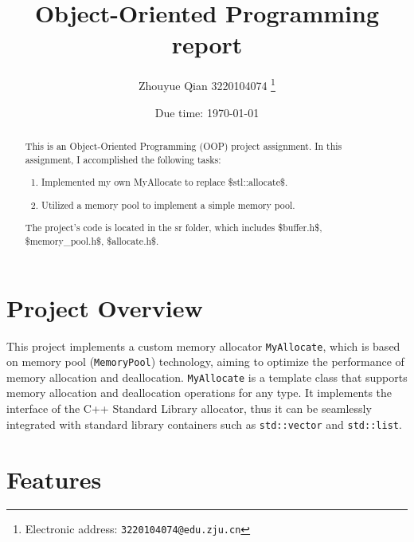 \documentclass[a4paper]{article}
\begin{document}
\title{Object-Oriented Programming report}

\author{Zhouyue Qian 3220104074
  \thanks{Electronic address: \texttt{3220104074@edu.zju.cn}}}
  


\date{Due time: \today}

\maketitle

\begin{abstract}
    This is an Object-Oriented Programming (OOP) project assignment. In this assignment, I accomplished the following tasks:
    \begin{enumerate}
      \item Implemented my own MyAllocate to replace \$stl::allocate\$.
      \item Utilized a memory pool to implement a simple memory pool.
    \end{enumerate}
    The project's code is located in the sr folder, which includes \$buffer.h\$, \$memory\_pool.h\$, \$allocate.h\$.
  \end{abstract}
  
  \section{Project Overview}

  This project implements a custom memory allocator \texttt{MyAllocate}, which is based on memory pool (\texttt{MemoryPool}) technology, aiming to optimize the performance of memory allocation and deallocation. \texttt{MyAllocate} is a template class that supports memory allocation and deallocation operations for any type. It implements the interface of the C++ Standard Library allocator, thus it can be seamlessly integrated with standard library containers such as \texttt{std::vector} and \texttt{std::list}.
  
  \section{Features}
  
\end{document}
